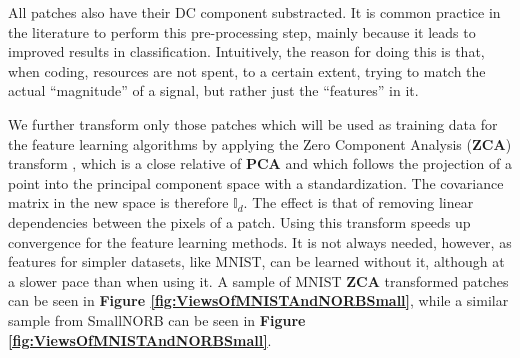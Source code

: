 \documentclass[12pt,a4paper,oneside,english]{UPBThesis}
\begin{document}
All patches also have their DC component substracted. It is common practice in the literature \cite{tiny-images} to perform this pre-processing step, mainly because it leads to improved results in classification. Intuitively, the reason for doing this is that, when coding, resources are not spent, to a certain extent, trying to match the actual ``magnitude'' of a signal, but rather just the ``features'' in it.

We further transform only those patches which will be used as training data for the feature learning algorithms by applying the Zero Component Analysis (\textbf{ZCA}) transform \cite{tiny-images}, which is a close relative of \textbf{PCA} and which follows the projection of a point into the principal component space with a standardization. The covariance matrix in the new space is therefore $\mathbb{I}_d$. The effect is that of removing linear dependencies between the pixels of a patch. Using this transform speeds up convergence for the feature learning methods. It is not always needed, however, as features for simpler datasets, like MNIST, can be learned without it, although at a slower pace than when using it. A sample of MNIST \textbf{ZCA} transformed patches can be seen in \textbf{Figure \ref{fig:ViewsOfMNISTAndNORBSmall}}, while a similar sample from SmallNORB can be seen in \textbf{Figure \ref{fig:ViewsOfMNISTAndNORBSmall}}.
\end{document}
